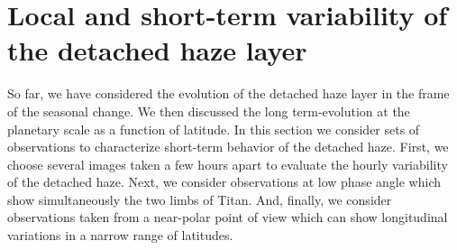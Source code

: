 \section{Local and short-term variability of the detached haze layer}

So far, we have considered the evolution of the detached haze layer in the frame of the seasonal change.
We then discussed the long term-evolution at the planetary scale as a function of latitude.
In this section we consider sets of observations to characterize short-term  behavior of the detached haze.
First, we choose several images taken a few hours apart to
evaluate the hourly variability of the detached haze. Next, we consider
observations at low phase angle which show simultaneously the two limbs of Titan. And, finally,
we consider observations taken from a near-polar point of view which can show
longitudinal variations in a narrow range of latitudes.



